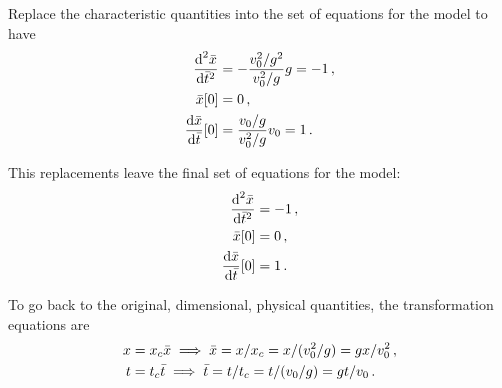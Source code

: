 Replace the characteristic quantities into the set of equations for the model to have
\begin{align*}
\dfrac{\text{d}^{2}{\bar{x}}}{\text{d}{\bar{t}}^{2}} &= -\dfrac{v_0^2/g^2}{v_0^2/g}g = -1\,,\\
\bar{x}\!\left[{0}\right] &= 0\,,\\
\dfrac{\text{d}{\bar{x}}}{\text{d}{\bar{t}}}\!\left[{0}\right] &= \dfrac{v_0/g}{v_0^2/g}v_0 = 1\,.
\end{align*}

This replacements leave the final set of equations for the model:
\begin{align*}
\dfrac{\text{d}^{2}{\bar{x}}}{\text{d}{\bar{t}}^{2}} &= -1\,,\\
\bar{x}\!\left[{0}\right] &= 0\,,\\
\dfrac{\text{d}{\bar{x}}}{\text{d}{\bar{t}}}\!\left[{0}\right] &= 1\,.
\end{align*}

To go back to the original, dimensional, physical quantities, the transformation equations are
\begin{align*}
x &= {x}_{c}\bar{x} \implies \bar{x} = x/{x}_{c} = x/(v_0^2/g) = gx/v_0^2\,,\\
t &= {t}_{c}\bar{t} \implies \bar{t} = t/{t}_{c} = t/(v_0/g) = gt/v_0\,. 
\end{align*}
